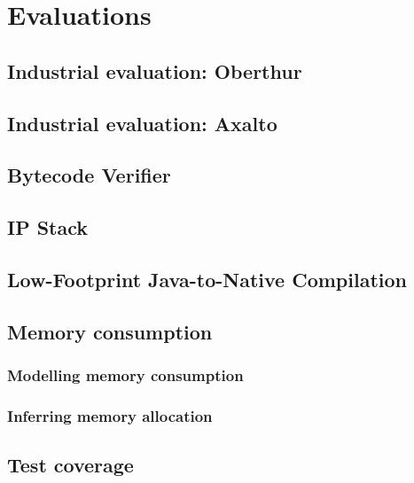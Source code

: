 \chapter{Evaluations}
\section{Industrial evaluation: Oberthur}
\section{Industrial evaluation: Axalto}
\section{Bytecode Verifier}
\section{IP Stack}
\section{Low-Footprint Java-to-Native Compilation}

\section{Memory consumption}

%
\subsection{Modelling memory consumption}\label{sec:verif}

\subsection{Inferring memory allocation}\label{sec:infer}

%
\section{Test coverage}
